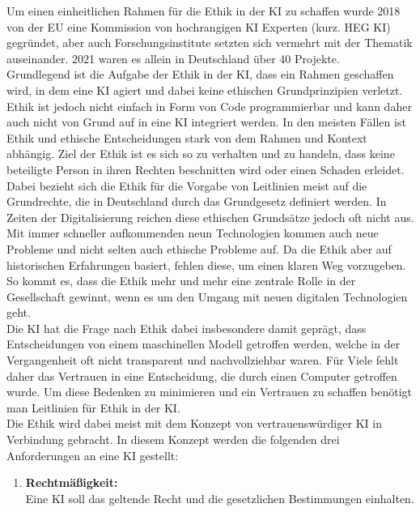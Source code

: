 \begin{onehalfspace}
        Um einen einheitlichen Rahmen für die Ethik in der \ac*{KI} zu schaffen wurde 2018 von der EU eine Kommission von hochrangigen \ac*{KI} Experten (kurz. HEG KI) gegründet, aber auch Forschungsinstitute setzten sich vermehrt mit der Thematik auseinander. 2021 waren es allein in Deutschland über 40 Projekte.\cite{Beckert2021}
        \\
        Grundlegend ist die Aufgabe der Ethik in der \ac*{KI}, dass ein Rahmen geschaffen wird, in dem eine \ac*{KI} agiert und dabei keine ethischen Grundprinzipien verletzt.\cite{Cremers2019} Ethik ist jedoch nicht einfach in Form von Code programmierbar und kann daher auch nicht von Grund auf in eine \ac*{KI} integriert werden. In den meisten Fällen ist Ethik und ethische Entscheidungen stark von dem Rahmen und Kontext abhängig. Ziel der Ethik ist es sich so zu verhalten und zu handeln, dass keine beteiligte Person in ihren Rechten beschnitten wird oder einen Schaden erleidet.\cite{Heesen2020}
        Dabei bezieht sich die Ethik für die Vorgabe von Leitlinien meist auf die Grundrechte, die in Deutschland durch das Grundgesetz definiert werden. In Zeiten der Digitalisierung reichen diese ethischen Grundsätze jedoch oft nicht aus. Mit immer schneller aufkommenden neun Technologien kommen auch neue Probleme und nicht selten auch ethische Probleme auf. Da die Ethik aber auf historischen Erfahrungen basiert, fehlen diese, um einen klaren Weg vorzugeben. So kommt es, dass die Ethik mehr und mehr eine zentrale Rolle in der Gesellschaft gewinnt, wenn es um den Umgang mit neuen digitalen Technologien geht.\cite{Cremers2019} \\
        Die \ac*{KI} hat die Frage nach Ethik dabei insbesondere damit geprägt, dass Entscheidungen von einem maschinellen Modell getroffen werden, welche in der Vergangenheit oft nicht transparent und nachvollziehbar waren. Für Viele fehlt daher das Vertrauen in eine Entscheidung, die durch einen Computer getroffen wurde. Um diese Bedenken zu minimieren und ein Vertrauen zu schaffen benötigt man Leitlinien für Ethik in der \ac*{KI}.\cite{Heesen2020}
        \\
        Die Ethik wird dabei meist mit dem Konzept von vertrauenswürdiger \ac*{KI} in Verbindung gebracht. In diesem Konzept werden die folgenden drei Anforderungen an eine \ac*{KI} gestellt:
        \begin{enumerate}
            \item \textbf{Rechtmäßigkeit:} \\ Eine \ac*{KI} soll das geltende Recht und die gesetzlichen Bestimmungen einhalten.

\end{enumerate}
\end{onehalfspace}
